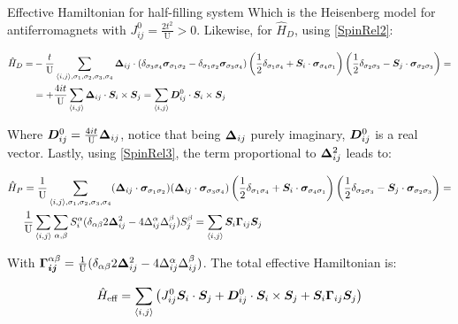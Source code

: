 \begin{section}{Effective Hamiltonian for half-filling system}
Which is the Heisenberg model for antiferromagnets with $J_{ij}^0 = \frac{2t^2}{\text{U}} > 0$. Likewise, for $\hat{H}_D$, using \ref{SpinRel2}:

\begin{align*}
\hat{H}_D = &-\frac{t}{\text{U}} \sum_{\langle i,j \rangle, \sigma_1, \sigma_2, \sigma_3, \sigma_4}\boldsymbol{\Delta}_{ij}\cdot(\delta_{\sigma_3 \sigma_4}\boldsymbol{\sigma}_{\sigma_1 \sigma_2} - \delta_{\sigma_1 \sigma_2} \boldsymbol{\sigma}_{\sigma_3\sigma_4})\left(\frac{1}{2}\delta_{\sigma_1 \sigma_4} + \boldsymbol{S}_i\cdot\boldsymbol{\sigma}_{\sigma_4 \sigma_1}\right)\left(\frac{1}{2}\delta_{\sigma_2 \sigma_3}-\boldsymbol{S}_j\cdot\boldsymbol{\sigma}_{\sigma_2 \sigma_3}\right) = \\
&= +\frac{4it}{\text{U}} \sum_{\langle i,j \rangle} \boldsymbol{\Delta}_{ij}\cdot \boldsymbol{S}_i \times \boldsymbol{S}_j = \sum_{\langle i,j \rangle} \boldsymbol{D}_{ij}^0\cdot \boldsymbol{S}_i \times \boldsymbol{S}_j
\end{align*}

Where $\boldsymbol{D}_{ij}^0 = \frac{4it}{\text{U}}\boldsymbol{\Delta}_{ij}$, notice that being $\boldsymbol{\Delta}_{ij}$ purely imaginary, $\boldsymbol{D}_{ij}^0$ is a real vector. 
Lastly, using \ref{SpinRel3}, the term proportional to $\boldsymbol{\Delta}_{ij}^2$ leads to:

\begin{align*}
\hat{H}_P &= \frac{1}{\text{U}}\sum_{\langle i,j \rangle, \sigma_1, \sigma_2, \sigma_3, \sigma_4} (\boldsymbol{\Delta}_{ij}\cdot\boldsymbol{\sigma}_{\sigma_1 \sigma_2})(\boldsymbol{\Delta}_{ij}\cdot \boldsymbol{\sigma}_{\sigma_3 \sigma_4}) \left(\frac{1}{2}\delta_{\sigma_1 \sigma_4} + \boldsymbol{S}_i\cdot\boldsymbol{\sigma}_{\sigma_4 \sigma_1}\right)\left(\frac{1}{2}\delta_{\sigma_2 \sigma_3}-\boldsymbol{S}_j\cdot\boldsymbol{\sigma}_{\sigma_2 \sigma_3}\right) = \\
&\frac{1}{\text{U}} \sum_{\langle i,j \rangle} \sum_{\alpha, \beta} S_i^\alpha (\delta_{\alpha \beta} 2\boldsymbol{\Delta}_{ij}^2 - 4\Delta_{ij}^\alpha\Delta_{ij}^\beta ) S_j^\beta = \sum_{\langle i,j \rangle} \boldsymbol{S}_i \boldsymbol{\Gamma}_{ij} \boldsymbol{S}_j
\end{align*}

With $\boldsymbol{\Gamma_{ij}}^{\alpha \beta} = \frac{1}{\text{U}}(\delta_{\alpha \beta} 2\boldsymbol{\Delta}_{ij}^2 - 4\Delta_{ij}^\alpha\Delta_{ij}^\beta)$.
The total effective Hamiltonian is:

\begin{equation}
\hat{H}_{\text{eff}} = \sum_{\langle i,j \rangle} \left( J_{ij}^0 \boldsymbol{S}_i\cdot\boldsymbol{S}_j + \boldsymbol{D}_{ij}^0 \cdot \boldsymbol{S}_i \times \boldsymbol{S}_j + \boldsymbol{S}_i \boldsymbol{\Gamma}_{ij} \boldsymbol{S}_j \right) \label{HeffNOEMF}
\end{equation}


\end{section}
